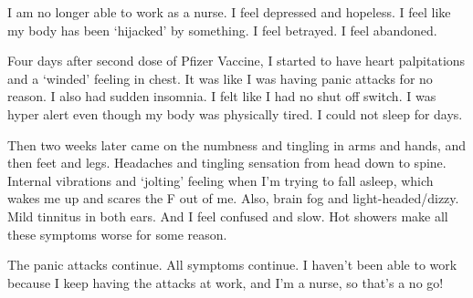 I am no longer able to work as a nurse. I feel depressed and hopeless. I feel
like my body has been ‘hijacked’ by something. I feel betrayed. I feel
abandoned.

Four days after second dose of Pfizer Vaccine, I started to have heart
palpitations and a ‘winded’ feeling in chest. It was like I was having panic
attacks for no reason. I also had sudden insomnia. I felt like I had no shut off
switch. I was hyper alert even though my body was physically tired. I could not
sleep for days.

Then two weeks later came on the numbness and tingling in arms and hands, and
then feet and legs. Headaches and tingling sensation from head down to
spine. Internal vibrations and ‘jolting’ feeling when I’m trying to fall asleep,
which wakes me up and scares the F out of me. Also, brain fog and
light-headed/dizzy. Mild tinnitus in both ears. And I feel confused and
slow. Hot showers make all these symptoms worse for some reason.

The panic attacks continue. All symptoms continue. I haven’t been able to work
because I keep having the attacks at work, and I’m a nurse, so that’s a no go!
